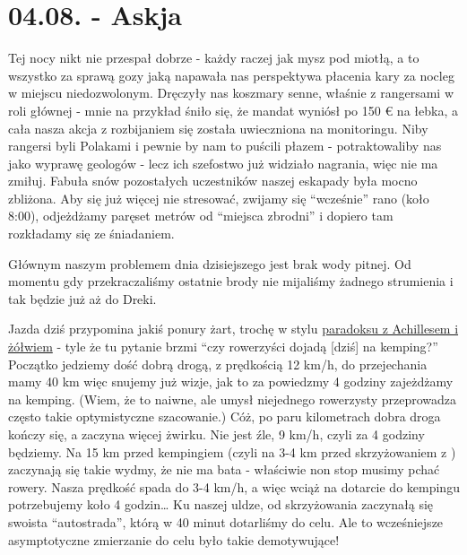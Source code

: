 \chapter{04.08. - Askja}

Tej nocy nikt nie przespał dobrze - każdy raczej jak mysz pod miotłą, a to wszystko za sprawą gozy jaką  napawała nas perspektywa płacenia kary za nocleg w miejscu niedozwolonym. Dręczyły nas koszmary senne, właśnie z rangersami w roli głównej - mnie na przykład śniło się, że mandat wyniósł po 150 € na łebka, a cała nasza akcja z rozbijaniem się została uwieczniona na monitoringu. Niby rangersi byli Polakami i pewnie by nam to puścili płazem - potraktowaliby nas jako wyprawę geologów - lecz ich szefostwo już widziało nagrania, więc nie ma zmiłuj. Fabuła snów pozostałych uczestników naszej eskapady była mocno zbliżona. Aby się już więcej nie stresować, zwijamy się “wcześnie” rano (koło 8:00), odjeżdżamy paręset metrów od “miejsca zbrodni” i dopiero tam rozkładamy się ze śniadaniem.

Głównym naszym problemem dnia dzisiejszego jest brak wody pitnej. Od momentu gdy przekraczaliśmy ostatnie brody nie mijaliśmy żadnego strumienia i tak będzie już aż do Dreki.



Jazda dziś przypomina jakiś ponury żart, trochę w stylu \href{http://pl.wikipedia.org/wiki/Paradoksy_Zenona_z_Elei#Achilles_i_.C5.BC.C3.B3.C5.82w.5B2.5D}{paradoksu z Achillesem i żółwiem} - tyle że tu pytanie brzmi “czy rowerzyści dojadą [dziś] na kemping?” Początko jedziemy dość dobrą drogą, z prędkością 12 km/h, do przejechania mamy 40 km więc snujemy już wizje, jak to za powiedzmy 4 godziny zajeżdżamy na kemping. (Wiem, że to naiwne, ale umysł niejednego rowerzysty przeprowadza często takie optymistyczne szacowanie.) Cóż, po paru kilometrach dobra droga kończy się, a zaczyna więcej żwirku. Nie jest źle, 9 km/h, czyli za 4 godziny będziemy. Na 15 km przed kempingiem (czyli na 3-4 km przed skrzyżowaniem z ) zaczynają się takie wydmy, że nie ma bata - właściwie non stop musimy pchać rowery. Nasza prędkość spada do 3-4 km/h, a więc wciąż na dotarcie do kempingu potrzebujemy koło 4 godzin… Ku naszej uldze, od skrzyżowania zaczynałą się swoista “autostrada”, którą w 40 minut dotarliśmy do celu. Ale to wcześniejsze asymptotyczne zmierzanie do celu było takie demotywujące!

